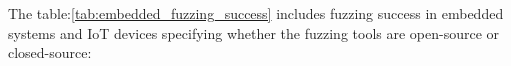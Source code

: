 \clearpage


The table:\ref{tab:embedded_fuzzing_success} includes fuzzing success in embedded systems and IoT devices
specifying whether the fuzzing tools are open-source or closed-source:

